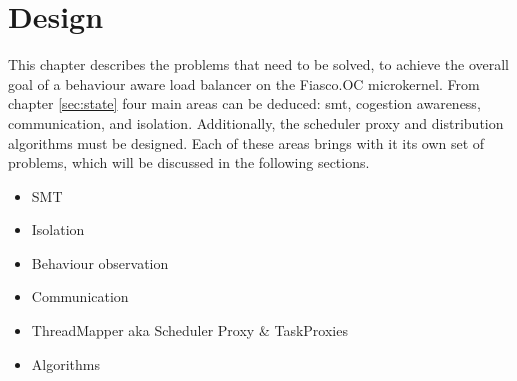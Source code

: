\chapter{Design}
\label{sec:design}




This chapter describes the problems that need to be solved, to achieve the
overall goal of a behaviour aware load balancer on the Fiasco.OC microkernel.
From chapter \ref{sec:state} four main areas can be deduced: \gls{smt},
cogestion awareness, communication, and isolation.
Additionally, the scheduler proxy and distribution algorithms must be designed.
Each of these areas brings with it its own set of problems, which will be
discussed in the following sections.





\begin{itemize}
  \item SMT
  \item Isolation
  \item Behaviour observation
  \item Communication
  \item ThreadMapper aka Scheduler Proxy \& TaskProxies
  \item Algorithms
\end{itemize}

